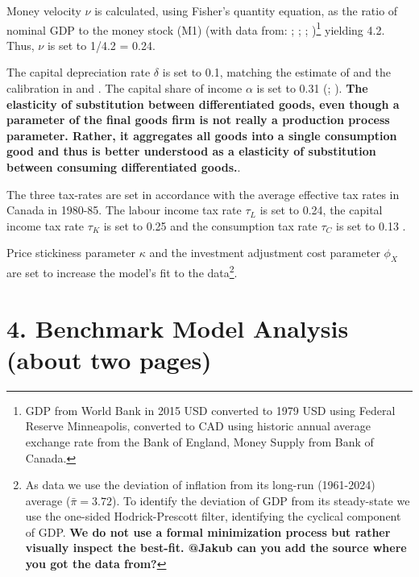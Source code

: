 \documentclass[12pt]{article}
\begin{document}
Money velocity $\nu$ is calculated, using Fisher's quantity equation, as the ratio of nominal GDP to the money stock (M1) (with data from: \textcite{bankofenglandCanadianDollarData2021}; 
\textcite{federalreservebankofminneapolisInflationCalculatorFederal}; \textcite{worldbankgroupWorldBankNational}; \textcite{bankofcanadaSelectedMonetaryAggregates})\footnote{GDP from World Bank in 2015 USD converted to 1979 USD using Federal Reserve Minneapolis, converted to CAD using historic annual average exchange rate from 
the Bank of England, Money Supply from Bank of Canada.} yielding 4.2. Thus, $\nu$ is set to 1/4.2 = 0.24. 

The capital depreciation rate $\delta$ is set to 0.1, matching the estimate of \textcite{statisticscanadaDepreciationRatesProductivity2007} and the calibration in \textcite{someOilDemandSupply2023} and \textcite{corriganToTEMIIIBank2021}.
The capital share of income $\alpha$ is set to 0.31 (\cite{fredst.louisShareLabourCompensation2021}; \cite{feenstraNextGenerationPenn2015}). 
\textbf{The elasticity of substitution between differentiated goods, even though a parameter of the final goods firm is not really a production process parameter. 
Rather, it aggregates all goods into a single consumption good and thus is better understood as a elasticity of substitution between consuming differentiated goods.}. 

The three tax-rates are set in accordance with the average effective tax rates in Canada in 1980-85. The labour income tax rate $\tau_L$ is set to 0.24, the capital income tax rate $\tau_K$ is set to 0.25 and the consumption tax rate $\tau_C$ is set to 0.13
\parencite{careyAverageEffectiveTax2000}. 

Price stickiness parameter $\kappa$ and the investment adjustment cost parameter $\phi_X$ are set to increase the model's fit to the data\footnote{As data we use the deviation of inflation from its long-run (1961-2024) average ($\bar{\pi} =  3.72$). To identify the deviation of GDP from its steady-state we use the one-sided Hodrick-Prescott filter, identifying the cyclical component of GDP. \textbf{We do not use a formal minimization process but rather visually inspect the best-fit. @Jakub can you add the source where you got the data from?}}.

\newpage
\section*{4. Benchmark Model Analysis (about two pages)}
\end{document}

